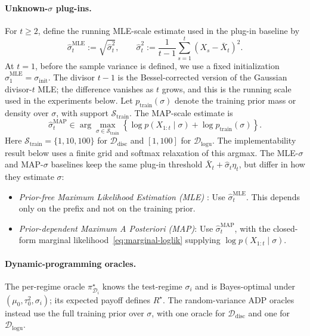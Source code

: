 \documentclass[11pt]{article}
\begin{document}
\paragraph{Unknown-\(\sigma\) plug-ins.}
For \(t\ge2\), define the running MLE-scale estimate used in the plug-in baseline by
\[
\hat\sigma_t^{\mathrm{MLE}}
:=
\sqrt{\hat\sigma_t^2},
\qquad
\hat\sigma_t^2
:=
\frac{1}{t-1}\sum_{s=1}^t (X_s-\bar X_t)^2 .
\]
At \(t=1\), before the sample variance is defined, we use a fixed initialization \(\hat\sigma_1^{\mathrm{MLE}}=\sigma_{\mathrm{init}}\). The divisor \(t-1\) is the Bessel-corrected version of the Gaussian divisor-\(t\) MLE; the difference vanishes as \(t\) grows, and this is the running scale used in the experiments below.
Let \(p_{\mathrm{train}}(\sigma)\) denote the training prior mass or density over \(\sigma\), with support \(\mathcal{S}_{\mathrm{train}}\). The MAP-scale estimate is
\[
\hat\sigma_t^{\mathrm{MAP}}
\in
\arg\max_{\sigma\in\mathcal{S}_{\mathrm{train}}}
\left\{
\log p(X_{1:t}\mid\sigma)+\log p_{\mathrm{train}}(\sigma)
\right\}.
\]
Here \(\mathcal{S}_{\mathrm{train}}=\{1,10,100\}\) for \(\mathcal{D}_{\mathrm{disc}}\) and \([1,100]\) for \(\mathcal{D}_{\mathrm{logu}}\). The implementability result below uses a finite grid and softmax relaxation of this argmax.
The MLE-\(\sigma\) and MAP-\(\sigma\) baselines keep the same plug-in threshold \(\bar X_t+\hat\sigma_t\eta_t\), but differ in how they estimate \(\sigma\):
\begin{itemize}
\item \emph{Prior-free \emph{Maximum Likelihood Estimation (MLE)} }: Use \(\hat\sigma_t^{\mathrm{MLE}}\). This depends only on the prefix and not on the training prior.
\item \emph{Prior-dependent \emph{Maximum A Posteriori (MAP)}}: Use \(\hat\sigma_t^{\mathrm{MAP}}\), with the closed-form marginal likelihood~\eqref{eq:marginal-loglik} supplying \(\log p(X_{1:t}\mid\sigma)\).
\end{itemize}

\paragraph{Dynamic-programming oracles.}
The per-regime oracle \(\pi^\star_{\mathcal{D}_i}\) knows the test-regime \(\sigma_i\) and is Bayes-optimal under \((\mu_0,\tau_0^2,\sigma_i)\); its expected payoff defines \(R^\star\). The random-variance ADP oracles instead use the full training prior over \(\sigma\), with one oracle for \(\mathcal{D}_{\mathrm{disc}}\) and one for \(\mathcal{D}_{\mathrm{logu}}\).
\end{document}
